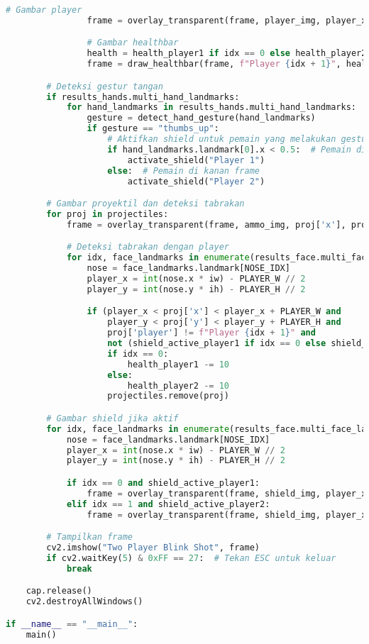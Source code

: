 \documentclass[11pt,a4paper]{article}
\begin{document}
\begin{lstlisting}[language=Python, caption=Main.py]
                # Gambar player
                frame = overlay_transparent(frame, player_img, player_x, player_y, (PLAYER_W, PLAYER_H))

                # Gambar healthbar
                health = health_player1 if idx == 0 else health_player2
                frame = draw_healthbar(frame, f"Player {idx + 1}", health, player_x, player_y - 20)

        # Deteksi gestur tangan
        if results_hands.multi_hand_landmarks:
            for hand_landmarks in results_hands.multi_hand_landmarks:
                gesture = detect_hand_gesture(hand_landmarks)
                if gesture == "thumbs_up":
                    # Aktifkan shield untuk pemain yang melakukan gestur
                    if hand_landmarks.landmark[0].x < 0.5:  # Pemain di kiri frame
                        activate_shield("Player 1")
                    else:  # Pemain di kanan frame
                        activate_shield("Player 2")

        # Gambar proyektil dan deteksi tabrakan
        for proj in projectiles:
            frame = overlay_transparent(frame, ammo_img, proj['x'], proj['y'], (proj['w'], proj['h']))

            # Deteksi tabrakan dengan player
            for idx, face_landmarks in enumerate(results_face.multi_face_landmarks[:2]):
                nose = face_landmarks.landmark[NOSE_IDX]
                player_x = int(nose.x * iw) - PLAYER_W // 2
                player_y = int(nose.y * ih) - PLAYER_H // 2

                if (player_x < proj['x'] < player_x + PLAYER_W and
                    player_y < proj['y'] < player_y + PLAYER_H and
                    proj['player'] != f"Player {idx + 1}" and
                    not (shield_active_player1 if idx == 0 else shield_active_player2)):
                    if idx == 0:
                        health_player1 -= 10
                    else:
                        health_player2 -= 10
                    projectiles.remove(proj)

        # Gambar shield jika aktif
        for idx, face_landmarks in enumerate(results_face.multi_face_landmarks[:2]):
            nose = face_landmarks.landmark[NOSE_IDX]
            player_x = int(nose.x * iw) - PLAYER_W // 2
            player_y = int(nose.y * ih) - PLAYER_H // 2

            if idx == 0 and shield_active_player1:
                frame = overlay_transparent(frame, shield_img, player_x, player_y, (PLAYER_W, PLAYER_H))
            elif idx == 1 and shield_active_player2:
                frame = overlay_transparent(frame, shield_img, player_x, player_y, (PLAYER_W, PLAYER_H))

        # Tampilkan frame
        cv2.imshow("Two Player Blink Shot", frame)
        if cv2.waitKey(5) & 0xFF == 27:  # Tekan ESC untuk keluar
            break

    cap.release()
    cv2.destroyAllWindows()

if __name__ == "__main__":
    main()
\end{lstlisting}
\end{document}
